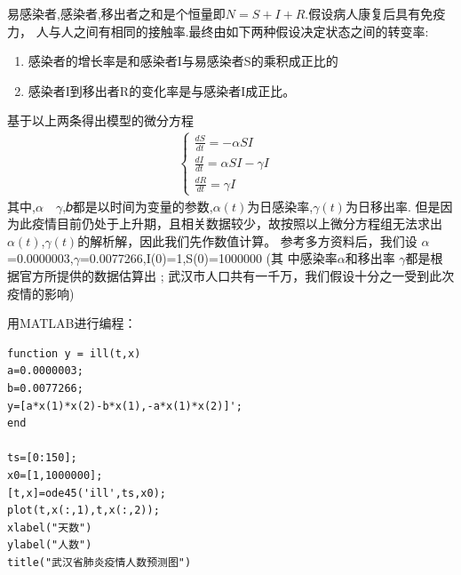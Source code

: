 \documentclass{article}
\begin{document}
易感染者,感染者,移出者之和是个恒量即$N=S+I+R$.假设病人康复后具有免疫力，
人与人之间有相同的接触率.最终由如下两种假设决定状态之间的转变率:
\begin{enumerate}
  \item 感染者的增长率是和感染者I与易感染者S的乘积成正比的
  \item 感染者I到移出者R的变化率是与感染者I成正比。
\end{enumerate}
基于以上两条得出模型的微分方程
 \begin{equation}
        \begin{split}
            \left\{
\begin{matrix}
\frac{dS}{dt}=-\alpha SI&\\ 
\frac{dI}{dt}=\alpha SI-\gamma I&\\ 
\frac{dR}{dt}=\gamma I&
\end{matrix}
\right.
        \end{split}
    \end{equation}
其中,$\alpha \quad \gamma$,𝑏都是以时间为变量的参数,$\alpha (t) $为日感染率,$\gamma (t)$为日移出率.
但是因为此疫情目前仍处于上升期，且相关数据较少，故按照以上微分方程组无法求出
$\alpha (t) $,$\gamma (t)$的解析解，因此我们先作数值计算。
参考多方资料后，我们设
$\alpha$=0.0000003,$\gamma$=0.0077266,I(0)=1,S(0)=1000000 (其
中感染率$\alpha$和移出率 $\gamma$都是根据官方所提供的数据估算出 ; 武汉市人口共有一千万，我们假设十分之一受到此次疫情的影响)

用MATLAB进行编程：
\begin{lstlisting}
function y = ill(t,x)
a=0.0000003;
b=0.0077266;
y=[a*x(1)*x(2)-b*x(1),-a*x(1)*x(2)]';
end

ts=[0:150];
x0=[1,1000000];
[t,x]=ode45('ill',ts,x0);
plot(t,x(:,1),t,x(:,2));
xlabel("天数")
ylabel("人数")
title("武汉省肺炎疫情人数预测图")
\end{lstlisting}
\end{document}
